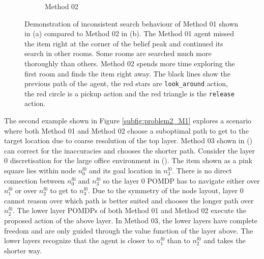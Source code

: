 \begin{figure}[b]
\begin{subfigure}[b]{0.49\textwidth}
        \caption{Method 02}
        \label{subfig:problem1_M2}
    \end{subfigure}
    \caption{Demonstration of inconsistent search behaviour of Method 01 shown in (a) compared to Method 02 in (b). The Method 01 agent missed the item right at the corner of the belief peak and continued its search in other rooms. Some rooms are searched much more thoroughly than others. Method 02 spends more time exploring the first room and finds the item right away. The black lines show the previous path of the agent, the red stars are \texttt{look\_around} action, the red circle is a pickup action and the red triangle is the \texttt{release} action.}
    \label{fig:M1_prob01}
\end{figure}

The second example shown in Figure \ref{subfig:problem2_M1} explores a scenario where both Method 01 and Method 02 choose a suboptimal path to get to the target location due to coarse resolution of the top layer. Method 03 shown in () can correct for the inaccuracies and chooses the shorter path. Consider the layer 0 discretisation for the large office environment in (). The item shown as a pink square lies within node $n_0^{l0}$ and its goal location in $n_3^{l0}$. There is no direct connection between $n_0^{l0}$ and $n_3^{l0}$ so the layer 0 POMDP has to navigate either over $n_1^{l0}$ or over $n_2^{l0}$ to get to $n_3^{l0}$. Due to the symmetry of the node layout, layer 0 cannot reason over which path is better suited and chooses the longer path over $n_2^{l0}$. The lower layer POMDPs of both Method 01 and Method 02 execute the proposed action of the above layer. In Method 03, the lower layers have complete freedom and are only guided through the value function of the layer above. The lower layers recognize that the agent is closer to $n_1^{l0}$ than to $n_2^{l0}$ and takes the shorter way.

